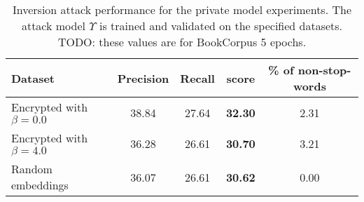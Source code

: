 \begin{table}[!ht]
	\begin{tabular*}{\linewidth}{ !{\extracolsep\fill} l c c >{\bfseries}c c } %
		\toprule
			Dataset							& Precision		& Recall	& \FOne{} score & \% of non-stop-words	\\
		\midrule
			Encrypted with $\beta = 0.0$	& 38.84			& 27.64		& 32.30			& 2.31					\\
			Encrypted with $\beta = 4.0$	& 36.28			& 26.61		& 30.70			& 3.21					\\
			Random embeddings				& 36.07			& 26.61		& 30.62			& 0.00					\\
		\bottomrule
	\end{tabular*}
	\caption[Inversion attack performance for the private model experiments]{
		Inversion attack performance for the private model experiments.
		The attack model $\Upsilon$ is trained and validated on the specified datasets.
		{\color{red}TODO\@: these values are for BookCorpus 5 epochs.}
	}%
	\label{table:knn-private}
\end{table}
